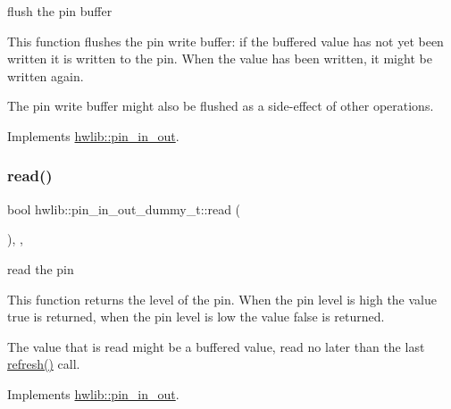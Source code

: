 flush the pin buffer

This function flushes the pin write buffer\+: if the buffered value has not yet been written it is written to the pin. When the value has been written, it might be written again.

The pin write buffer might also be flushed as a side-\/effect of other operations. 

Implements \hyperlink{classhwlib_1_1pin__in__out_a5207c9e30f0c88e4c052952397c2da88}{hwlib\+::pin\+\_\+in\+\_\+out}.

\mbox{\label{classhwlib_1_1pin__in__out__dummy__t_a6cc3d99badf70aae8b076594ffd5f465}} 
\subsubsection{\texorpdfstring{read()}{read()}}
{\footnotesize\ttfamily bool hwlib\+::pin\+\_\+in\+\_\+out\+\_\+dummy\+\_\+t\+::read (\begin{DoxyParamCaption}{ }\end{DoxyParamCaption})\hspace{0.3cm}{\ttfamily [inline]}, {\ttfamily [override]}, {\ttfamily [virtual]}}

read the pin

This function returns the level of the pin. When the pin level is high the value true is returned, when the pin level is low the value false is returned.

The value that is read might be a buffered value, read no later than the last \hyperlink{classhwlib_1_1pin__in__out__dummy__t_a7553d2ee2e380a7156655c725dd71e71}{refresh()} call. 

Implements \hyperlink{classhwlib_1_1pin__in__out_a5caebc7ab9fe49b7e020b89f0a2cf892}{hwlib\+::pin\+\_\+in\+\_\+out}.

\mbox{\label{classhwlib_1_1pin__in__out__dummy__t_a7553d2ee2e380a7156655c725dd71e71}} 
